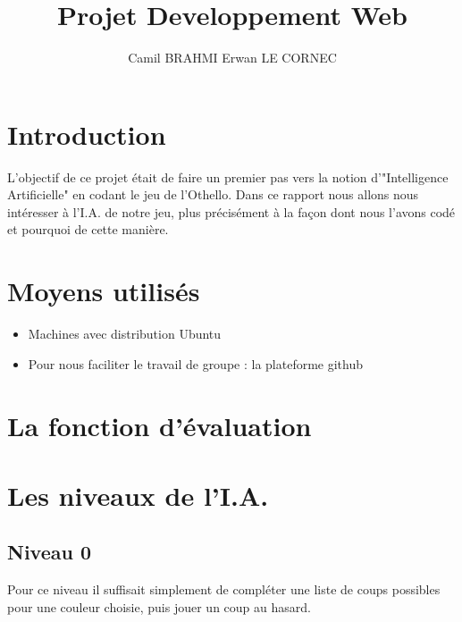 \documentclass[a4paper, 11pt]{article}
\title{Projet Developpement Web}
\author{{Camil BRAHMI} {Erwan LE CORNEC}}
\begin{document}
\maketitle

\newpage
\tableofcontent

\newpage
\section{Introduction}
  L'objectif de ce projet était de faire un premier pas vers la notion d'"Intelligence Artificielle" en codant le jeu de l'Othello. Dans ce rapport nous allons nous intéresser à l'I.A. de notre jeu, plus précisément à la façon dont nous l'avons codé et pourquoi de cette manière.
  

\section{Moyens utilisés}
\begin{itemize}
\item Machines avec distribution Ubuntu
\item Pour nous faciliter le travail de groupe : la plateforme github
\end{itemize}

\section{La fonction d'évaluation}


\section{Les niveaux de l'I.A.}
\subsection{Niveau 0}
Pour ce niveau il suffisait simplement de compléter une liste de coups possibles pour une couleur choisie, puis jouer un coup au hasard.
\end{document}
